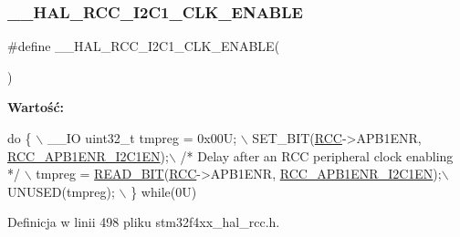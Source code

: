 \subsubsection{\texorpdfstring{\+\_\+\+\_\+\+H\+A\+L\+\_\+\+R\+C\+C\+\_\+\+I2\+C1\+\_\+\+C\+L\+K\+\_\+\+E\+N\+A\+B\+LE}{\_\_HAL\_RCC\_I2C1\_CLK\_ENABLE}}
{\footnotesize\ttfamily \#define \+\_\+\+\_\+\+H\+A\+L\+\_\+\+R\+C\+C\+\_\+\+I2\+C1\+\_\+\+C\+L\+K\+\_\+\+E\+N\+A\+B\+LE(\begin{DoxyParamCaption}{ }\end{DoxyParamCaption})}

{\bfseries Wartość\+:}
\begin{DoxyCode}
\textcolor{keywordflow}{do} \{ \(\backslash\)
                                        \_\_IO uint32\_t tmpreg = 0x00U; \(\backslash\)
                                        SET\_BIT(\hyperlink{group___peripheral__declaration_ga74944438a086975793d26ae48d5882d4}{RCC}->APB1ENR, 
      \hyperlink{group___peripheral___registers___bits___definition_ga5ca3afe0c517702b2d1366b692c8db0e}{RCC\_APB1ENR\_I2C1EN});\(\backslash\)
                                        \textcolor{comment}{/* Delay after an RCC peripheral clock enabling */} \(\backslash\)
                                        tmpreg = \hyperlink{group___exported__macro_ga822bb1bb9710d5f2fa6396b84e583c33}{READ\_BIT}(\hyperlink{group___peripheral__declaration_ga74944438a086975793d26ae48d5882d4}{RCC}->APB1ENR, 
      \hyperlink{group___peripheral___registers___bits___definition_ga5ca3afe0c517702b2d1366b692c8db0e}{RCC\_APB1ENR\_I2C1EN});\(\backslash\)
                                        UNUSED(tmpreg); \(\backslash\)
                                          \} \textcolor{keywordflow}{while}(0U)
\end{DoxyCode}


Definicja w linii 498 pliku stm32f4xx\+\_\+hal\+\_\+rcc.\+h.

\mbox{\label{group___r_c_c___a_p_b1___clock___enable___disable_ga3ebc5988bcf1e2965ed482fd76c67b22}} 
